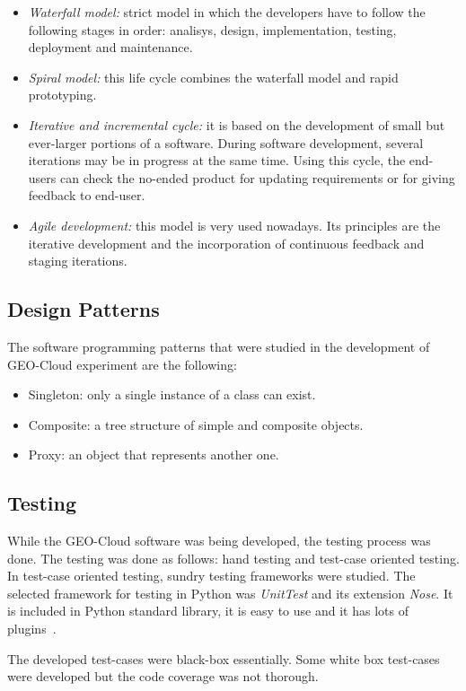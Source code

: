 \begin{itemize}
\item \emph{Waterfall model:} strict model in which the developers have to
  follow the following stages in order: analisys, design, implementation, testing, deployment and maintenance.
\item \emph{Spiral model:} this life cycle combines the waterfall model and rapid
  prototyping.
\item \emph{Iterative and incremental cycle:} it is based on the development of small but
  ever-larger portions of a software. During software development, several
  iterations may be in progress at the same time. Using this cycle, the
  end-users can check the no-ended product for updating requirements or for giving feedback
  to end-user.
\item \emph{Agile development:} this model is very used nowadays. Its principles
  are the iterative development and the incorporation of continuous feedback and
  staging iterations.
\end{itemize}

\subsection{Design Patterns}

The software programming patterns that were studied in the development of
GEO-Cloud experiment are the following:
\begin{itemize}
\item Singleton: only a single instance of a class can exist.
\item Composite: a tree structure of simple and composite objects.
\item Proxy: an object that represents another one.
\end{itemize}

\subsection{Testing}

While the GEO-Cloud software was being developed, the testing process was
done. The testing was done as follows: hand testing and test-case oriented
testing. In test-case oriented testing, sundry testing frameworks were studied.
The selected framework for testing in Python was \emph{UnitTest} and its
extension \emph{Nose}. It is included in Python standard library, it is easy to use
and it has lots of plugins~\cite{Foundation2014a}.

The developed test-cases were black-box essentially. Some white box test-cases
were developed but the code coverage was not thorough.
